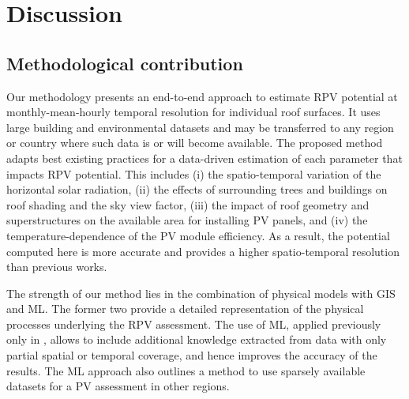 



\section{Discussion}
\label{discussion_pv}

\subsection{Methodological contribution}

Our methodology presents an end-to-end approach to estimate RPV potential at monthly-mean-hourly temporal resolution for individual roof surfaces. It uses large building and environmental datasets and may be transferred to any region or country where such data is or will become available. 
The proposed method adapts best existing practices for a data-driven estimation of each parameter that impacts RPV potential. This includes
(i) the spatio-temporal variation of the horizontal solar radiation,
(ii) the effects of surrounding trees and buildings on roof shading and the sky view factor,
(iii) the impact of roof geometry and superstructures on the available area for installing PV panels, and
(iv) the temperature-dependence of the PV module efficiency.
As a result, the potential computed here is more accurate and provides a higher spatio-temporal resolution than previous works.

The strength of our method lies in the combination of physical models with GIS and ML. The former two provide a detailed representation of the physical processes underlying the RPV assessment. The use of ML, applied previously only in \cite{assouline_quantifying_2017, assouline_large-scale_2018}, allows to include additional knowledge extracted from data with only partial spatial or temporal coverage, and hence improves the accuracy of the results. 
The ML approach also outlines a method to use sparsely available datasets for a PV assessment in other regions.

